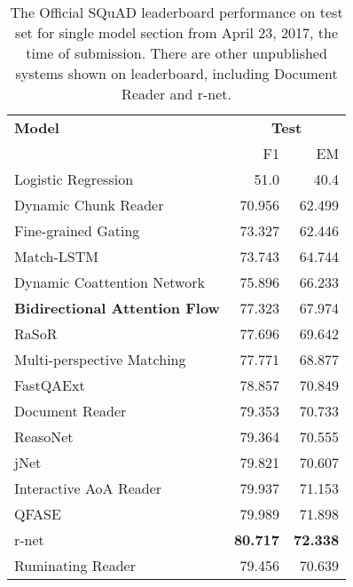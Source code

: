 \documentclass[11pt,letterpaper]{article}
\makeatletter
\newcommand{\ssymbol}[1]{^{\@fnsymbol{#1}}}
\makeatother
\begin{document}
\begin{table}[t]
\renewcommand{\thefootnote}{\fnsymbol{footnote}}
\begin{threeparttable}

\centering
\small
\begin{tabular}{l r r}
\toprule

{\bf Model} &
\multicolumn{2}{c}{\bf Test} \\

{}    & F1 & EM \\
\midrule
Logistic Regression\tnote{a} & 51.0 & 40.4\\ 
Dynamic Chunk Reader\tnote{b} & 70.956  & 62.499\\ 
Fine-grained Gating\tnote{c} & 73.327  & 62.446\\ 
Match-LSTM\tnote{d} & 73.743  & 64.744\\
Dynamic Coattention Network\tnote{e} & 75.896  & 66.233\\ 
\textbf{Bidirectional Attention Flow}\tnote{f} & 77.323  & 67.974\\
RaSoR\tnote{g} & 77.696  & 69.642\\
Multi-perspective Matching\tnote{h}& 77.771  & 68.877 \\ 
FastQAExt\tnote{i}& 78.857 & 70.849 \\
Document Reader\tnote{j} & 79.353 & 70.733\\
ReasoNet\tnote{k}& 79.364 & 70.555  \\
jNet\tnote{l}& 79.821  & 70.607 \\
Interactive AoA Reader\tnote{$\ssymbol{3}$} & 79.937 & 71.153 \\
QFASE\tnote{$\ssymbol{3}$} & 79.989 & 71.898 \\
r-net\tnote{$\ssymbol{3}$} & \textbf{80.717} & \textbf{72.338} \\
\midrule
Ruminating Reader & 79.456 & 70.639 \\
\bottomrule

\end{tabular}
\caption{The Official SQuAD leaderboard performance on test set for single model section from April 23, 2017, the time of submission. There are other unpublished systems shown on leaderboard, including Document Reader and r-net.}\label{tab:results}


\end{threeparttable}
\end{table}
\end{document}
